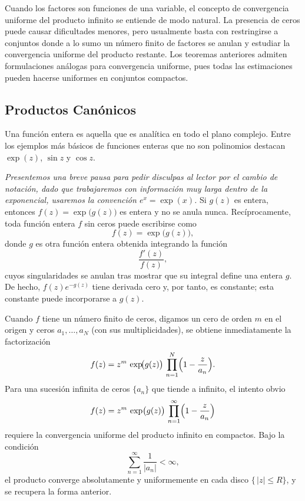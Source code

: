 \documentclass{article}
\theoremstyle{nonumberplain}
\begin{document}
Cuando los factores son funciones de una variable, el concepto de convergencia uniforme del producto infinito se entiende de modo natural. La presencia de ceros puede causar dificultades menores, pero usualmente basta con restringirse a conjuntos donde a lo sumo un número finito de factores se anulan y estudiar la convergencia uniforme del producto restante. Los teoremas anteriores admiten formulaciones análogas para convergencia uniforme, pues todas las estimaciones pueden hacerse uniformes en conjuntos compactos.

\subsection{Productos Canónicos}

Una función entera es aquella que es analítica en todo el plano complejo. Entre los ejemplos más básicos de funciones enteras que no son polinomios destacan \(\exp(z)\), \(\sin z\) y \(\cos z\).

\textit{Presentemos una breve pausa para pedir disculpas al lector por el cambio de notación, dado que trabajaremos con información muy larga dentro de la exponencial, usaremos la convención \(e^x = \exp(x)\).} Si \(g(z)\) es entera, entonces \(f(z)=\exp\bigl(g(z)\bigr)\) es entera y no se anula nunca. Recíprocamente, toda función entera \(f\) sin ceros puede escribirse como
\[
f(z)=\exp\bigl(g(z)\bigr)\!,
\]
donde \(g\) es otra función entera obtenida integrando la función
\[
\frac{f'(z)}{f(z)},
\]
cuyos singularidades se anulan tras mostrar que su integral define una entera \(g\). De hecho, \(f(z)e^{-g(z)}\) tiene derivada cero y, por tanto, es constante; esta constante puede incorporarse a \(g(z)\).

Cuando \(f\) tiene un número finito de ceros, digamos un cero de orden \(m\) en el origen y ceros \(a_{1},\dots,a_{N}\) (con sus multiplicidades), se obtiene inmediatamente la factorización
\[
f(z)
=
z^{m}\,\exp\!\bigl(g(z)\bigr)\,
\prod_{n=1}^{N}\Bigl(1-\frac{z}{a_{n}}\Bigr).
\]
Para una sucesión infinita de ceros \(\{a_{n}\}\) que tiende a infinito, el intento obvio
\[
f(z)
=
z^{m}\,\exp\bigl(g(z)\bigr)\,
\prod_{n=1}^{\infty}\Bigl(1-\frac{z}{a_{n}}\Bigr)
\]
requiere la convergencia uniforme del producto infinito en compactos. Bajo la condición
\[
\sum_{n=1}^\infty\frac{1}{|a_{n}|}<\infty,
\]
el producto converge absolutamente y uniformemente en cada disco \(\{\,|z|\le R\}\), y se recupera la forma anterior.
\end{document}
